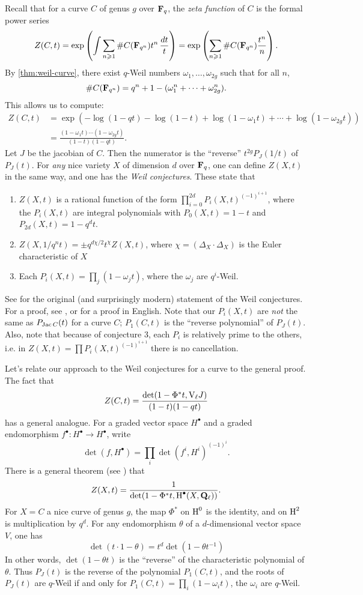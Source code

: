 Recall that for a curve $C$ of genus $g$ over $\mathbf{F}_q$, the \emph{zeta function} 
of $C$ is the formal power series 
\[
  Z(C,t) = \exp\left(\int \sum_{n\geqslant 1} \# C(\mathbf{F}_{q^n}) t^n\, \frac{dt}{t}\right)
    = \exp\left( \sum_{n\geqslant 1} \# C(\mathbf{F}_{q^n}) \frac{t^n}{n}\right) \text{.}
\]
By \autoref{thm:weil-curve}, there exist $q$-Weil numbers 
$\omega_1,\dots,\omega_{2 g}$ such that for all $n$, 
\[
  \# C(\mathbf{F}_{q^n}) = q^n+1 - (\omega_1^n + \cdots + \omega_{2 g}^n) \text{.}
\]
This allows us to compute:
\begin{align*}
  Z(C,t) &= \exp(-\log(1-q t) - \log(1-t) + \log(1-\omega_1 t) + \cdots + \log(1-\omega_{2 g} t)) \\
    &= \frac{(1-\omega_1 t)\cdots (1-\omega_{2g} t)}{(1-t)(1-q t)} \text{.}
\end{align*}
Let $J$ be the jacobian of $C$. Then the numerator is the 
``reverse'' $t^{2g} P_J(1/t)$ of $P_J(t)$. For 
\emph{any} nice variety $X$ of dimension $d$ over $\mathbf{F}_q$, one can define 
$Z(X,t)$ in the same way, and one has the \emph{Weil conjectures}. These state 
that 
\begin{enumerate}
  \item $Z(X,t)$ is a rational function of the form 
    $\prod_{i=0}^{2 d} P_i(X,t)^{(-1)^{i+1}}$, where the $P_i(X,t)$ are 
    integral polynomials with $P_0(X,t)=1-t$ and $P_{2 d}(X,t) = 1-q^d t$. 
  \item $Z(X,1/q^n t) = \pm q^{d\chi/2} t^\chi Z(X,t)$, where 
    $\chi=(\Delta_X\cdot \Delta_X)$ is the Euler characteristic of $X$
  \item Each $P_i(X,t) = \prod_j (1 - \omega_j t)$, where the $\omega_j$  are 
    $q^i$-Weil. 
\end{enumerate}
See \cite{we49} for the original (and surprisingly modern) statement of the 
Weil conjectures. For a proof, see \cite{de74}, or \cite{mi-ec} for a proof in 
English. Note that our $P_i(X,t)$ are \emph{not} the same as 
$P_{\operatorname{Jac} C}(t)$ for a curve $C$; $P_1(C,t)$ is the ``reverse polynomial'' of 
$P_J(t)$. Also, note that because of conjecture 3, each 
$P_i$ is relatively prime to the others, i.e. in 
$Z(X,t) = \prod P_i(X,t)^{(-1)^{i+1}}$ there is no cancellation. 

Let's relate our approach to the Weil conjectures for a curve to the general 
proof. The fact that 
\[
  Z(C,t) = \frac{\det(1-\Phi^\ast t,\mathrm{V}_\ell J)}{(1-t)(1-q t)}
\]
has a general analogue. For a graded vector space $H^\bullet$ and a graded 
endomorphism $f^\bullet:H^\bullet \to H^\bullet$, write 
\[
  \det(f,H^\bullet) = \prod_i \det(f^i, H^i)^{(-1)^i} \text{.}
\]
There is a general theorem (see \cite[1.5.4]{de74}) that
\[
  Z(X,t) = \frac{1}{\det(1-\Phi^\ast t,\operatorname{H}^\bullet(X,\mathbf{Q}_\ell))} \text{.}
\]
For $X=C$ a nice curve of genus $g$, the map $\Phi^\ast$ on $\operatorname{H}^0$ is 
the identity, and on $\operatorname{H}^2$ is multiplication by $q^d$. For any endomorphism 
$\theta$ of a $d$-dimensional vector space $V$, one has 
\[
  \det(t\cdot 1-\theta) = t^d \det(1-\theta t^{-1})
\]
In other words, $\det(1-\theta t)$ is the ``reverse'' of the characteristic 
polynomial of $\theta$. Thus $P_J(t)$ is the reverse of the polynomial 
$P_1(C,t)$, and the roots of $P_J(t)$ are 
$q$-Weil if and only for $P_1(C,t) = \prod_i (1-\omega_i t)$, the 
$\omega_i$ are $q$-Weil. 

